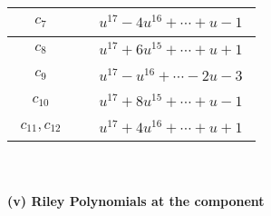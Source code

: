 \documentclass[1p]{elsarticle_modified}
\theoremstyle{definition}
\begin{document}
\begin{tabular}{m{50pt}|m{274pt}}
\hline $$\begin{aligned}c_{7}\end{aligned}$$&$\begin{aligned}
&u^{17}-4 u^{16}+\cdots+u-1
\end{aligned}$\\
\hline $$\begin{aligned}c_{8}\end{aligned}$$&$\begin{aligned}
&u^{17}+6 u^{15}+\cdots+u+1
\end{aligned}$\\
\hline $$\begin{aligned}c_{9}\end{aligned}$$&$\begin{aligned}
&u^{17}- u^{16}+\cdots-2 u-3
\end{aligned}$\\
\hline $$\begin{aligned}c_{10}\end{aligned}$$&$\begin{aligned}
&u^{17}+8 u^{15}+\cdots+u-1
\end{aligned}$\\
\hline $$\begin{aligned}c_{11},c_{12}\end{aligned}$$&$\begin{aligned}
&u^{17}+4 u^{16}+\cdots+u+1
\end{aligned}$\\
\hline
\end{tabular}\\~\\
\newpage\renewcommand{\arraystretch}{1}
\flushleft \textbf{(v) Riley Polynomials at the component}\newline \\
\end{document}
